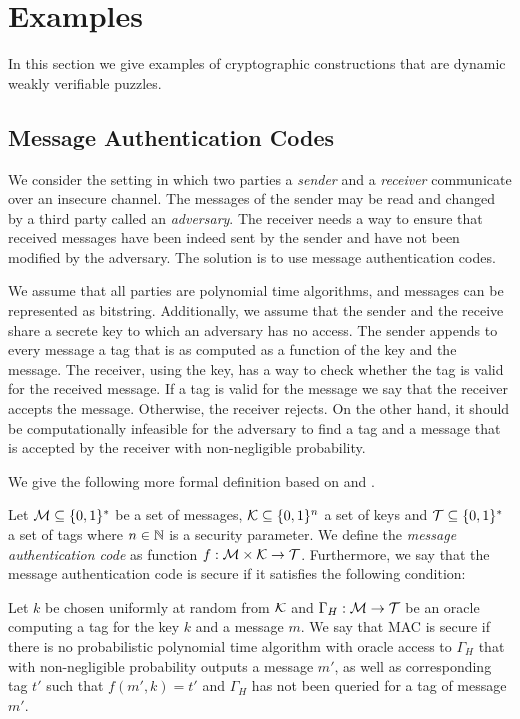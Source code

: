 \documentclass[11pt,a4paper,titlepage]{memoir}
\begin{document}
\section{Examples}
\label{section:wvp_examples}
In this section we give examples of cryptographic constructions that are dynamic weakly verifiable puzzles.

\subsection{Message Authentication Codes}
We consider the setting in which two parties a \textit{sender} and a \textit{receiver} communicate over an insecure channel.
The messages of the sender may be read and changed by a third party called an \textit{adversary}.
The receiver needs a way to ensure that received messages have been indeed sent by the sender and have not been modified by the adversary.
The solution is to use message authentication codes.

We assume that all parties are polynomial time algorithms, and messages can be represented as bitstring.
Additionally, we assume that the sender and the receive share a secrete key to which an adversary has no access.
The sender appends to every message a tag that is as computed as a function of the key and the message.
The receiver, using the key, has a way to check whether the tag is valid for the received message. If a tag is valid for the message we say that the receiver
accepts the message. Otherwise, the receiver rejects.
On the other hand, it should be computationally infeasible for the adversary to find a tag and a message that is accepted by the receiver with non-negligible probability.

We give the following more formal definition based on \cite{LectureNotesCrypo} and \cite{Goldreich:2004:FCV:975541}.
\begin{definition}
  Let $\mathcal{M} \subseteq \{0,1\}^*$ be a set of messages, $\mathcal{K} \subseteq \{0,1\}^{n}$ a set of keys and $\mathcal{T} \subseteq \{0,1\}^*$ a set of tags where $n \in \mathbb{N}$
  is a security parameter. We define the \textit{message authentication code} as function $f:\mathcal{M} \times \mathcal{K} \rightarrow \mathcal{T}$. Furthermore, we say
  that the message authentication code is secure if it satisfies the following condition:

  Let $k$ be chosen uniformly at random from $\mathcal{K}$ and $\Gamma_H: \mathcal{M} \rightarrow \mathcal{T}$ be an oracle computing
  a tag for the key $k$ and a message $m$. We say that MAC is secure if there is no probabilistic polynomial time algorithm with oracle access to $\Gamma_H$
  that with non-negligible probability outputs a message $m'$, as well as corresponding tag $t'$ such that $f(m', k) = t'$
  and $\Gamma_H$ has not been queried for a tag of message $m'$.
\end{definition}
\end{document}
